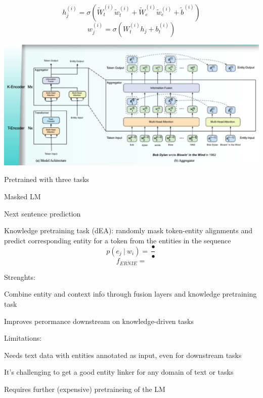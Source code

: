\documentclass[10pt]{report}
\begin{document}
$$ h_j^{(i)} = \sigma(\tilde{W}_t^{(i)}\tilde{w}_t^{(i)} + \tilde{W}_e^{(i)}\tilde{w}_e^{(i)}+\tilde{b}^{(i)})$$
$$w_j^{(i)} = \sigma(W_t^{(i)}h_j+b_t^{(i)})$$
$$ $$ %
\begin{center}
	\includegraphics[scale=0.5]{109.png}
\end{center}
Pretrained with three tasks
\begin{list}{}{}
	\item Masked LM 
	\item Next sentence prediction
	\item Knowledge pretraining task (dEA): randomly mask token-entity alignments and predict corresponding entity for a token from the entities in the sequence
	$$p(e_j\:|\:w_i) = \frac{•}{•}$$ %
	$$f_{ERNIE} = $$ %
\end{list}
Strenghts:
\begin{list}{}{}
	\item Combine entity and context info through fusion layers and knowledge pretraining task
	\item Improves perormance downstream on knowledge-driven tasks
\end{list}
Limitations:
\begin{list}{}{}
	\item Needs text data with entities annotated as input, even for downstream tasks
	\item It's challenging to get a good entity linker for any domain of text or tasks
	\item Requires further (expensive) pretraineing of the LM
\end{list}
\end{document}
